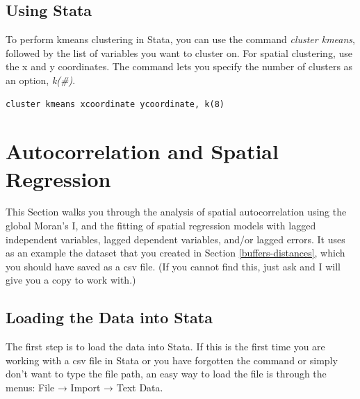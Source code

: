 \documentclass[]{book}
\begin{document}
\hypertarget{using-stata}{%
\section{Using Stata}\label{using-stata}}

To perform kmeans clustering in Stata, you can use the command \emph{cluster kmeans}, followed by the list of variables you want to cluster on. For spatial clustering, use the x and y coordinates. The command lets you specify the number of clusters as an option, \emph{k(\#)}.

\begin{verbatim}
cluster kmeans xcoordinate ycoordinate, k(8)
\end{verbatim}

\hypertarget{autocorrelation}{%
\chapter{Autocorrelation and Spatial Regression}\label{autocorrelation}}

This Section walks you through the analysis of spatial autocorrelation using the global Moran's I, and the fitting of spatial regression models with lagged independent variables, lagged dependent variables, and/or lagged errors. It uses as an example the dataset that you created in Section \ref{buffers-distances}, which you should have saved as a csv file. (If you cannot find this, just ask and I will give you a copy to work with.)

\hypertarget{loading-the-data-into-stata}{%
\section{Loading the Data into Stata}\label{loading-the-data-into-stata}}

The first step is to load the data into Stata. If this is the first time you are working with a csv file in Stata or you have forgotten the command or simply don't want to type the file path, an easy way to load the file is through the menus: File → Import → Text Data.
\end{document}
